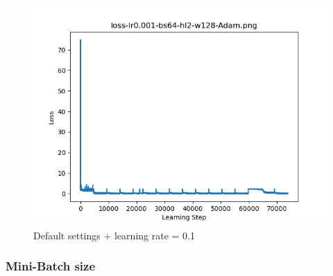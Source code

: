 \documentclass{article}[12pt]
\begin{document}
        \begin{figure}[H]
        \includegraphics[width=\linewidth]{testsResults/loss/lr/def.png}
        \caption{Default settings + learning rate = 0.1}
        \endminipage
    \end{figure}

\subsubsection{Mini-Batch size}
\end{document}
